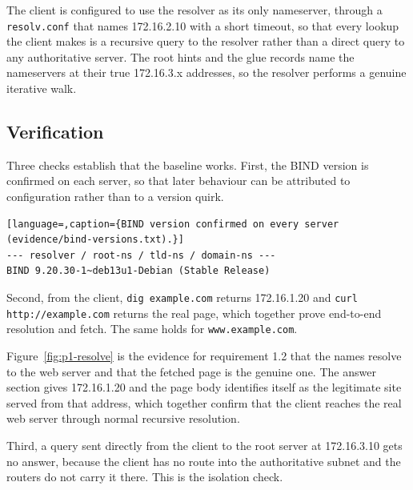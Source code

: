\documentclass[11pt]{article}
\begin{document}
The client is configured to use the resolver as its only nameserver, through a
\texttt{resolv.conf} that names 172.16.2.10 with a short timeout, so that every
lookup the client makes is a recursive query to the resolver rather than a direct
query to any authoritative server. The root hints and the glue records name the
nameservers at their true 172.16.3.x addresses, so the resolver performs a genuine
iterative walk.

\subsection{Verification}

Three checks establish that the baseline works. First, the BIND version is
confirmed on each server, so that later behaviour can be attributed to
configuration rather than to a version quirk.

\begin{lstlisting}[language=,caption={BIND version confirmed on every server (evidence/bind-versions.txt).}]
--- resolver / root-ns / tld-ns / domain-ns ---
BIND 9.20.30-1~deb13u1-Debian (Stable Release)
\end{lstlisting}

Second, from the client, \texttt{dig example.com} returns 172.16.1.20 and
\texttt{curl http://example.com} returns the real page, which together prove
end-to-end resolution and fetch. The same holds for \texttt{www.example.com}.


Figure~\ref{fig:p1-resolve} is the evidence for requirement 1.2
that the names resolve to the web server and that the fetched page is the genuine
one. The answer section gives 172.16.1.20 and the page body identifies itself as
the legitimate site served from that address, which together confirm that the
client reaches the real web server through normal recursive resolution.

Third, a query sent directly from the client to the root server at 172.16.3.10
gets no answer, because the client has no route into the authoritative subnet and
the routers do not carry it there. This is the isolation check.
\end{document}

